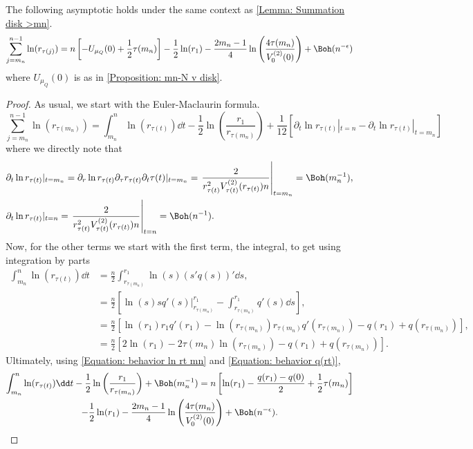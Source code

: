 \begin{proposicao}	\label{Proposition: mn-N lnr disk}
	The following asymptotic holds under the same context as \autoref{Lemma: Summation disk >mn}.
	\begin{equation}
		\sum_{j=m_n}^{n-1} \ln(r_{\tau(j)}) = n \left[- U_{\mu_Q}(0) + \frac{1}{2} \tau(m_n)\right] - \frac{1}{2} \ln(r_1) - \frac{2 m_n - 1}{4} \ln\left( \frac{4 \tau(m_n)}{V^{(2)}_0(0)} \right) + \Boh(n^{-\epsilon})
	\end{equation}
	where $U_{\mu_Q}(0)$ is as in \autoref{Proposition: mn-N v disk}.
\end{proposicao}
\begin{proof}
	As usual, we start with the Euler-Maclaurin formula.
	\begin{equation}
		\sum_{j = m_n}^{n-1} \ln(r_{\tau(m_n)}) = \int_{m_n}^{n} \ln(r_{\tau(t)}) \dd t - \frac{1}{2} \ln\left( \frac{r_1}{r_{\tau(m_n)}}\right) + \frac{1}{12} \left[ \partial_t \ln r_{\tau(t)} |_{t = n} - \partial_t \ln r_{\tau(t)} |_{t = m_n} \right]
	\end{equation} 
	where we directly note that
	\begin{align}
		& \partial_t \ln r_{\tau(t)} |_{t = m_n} = \partial_r \ln r_{\tau(t)} \partial_\tau r_{\tau(t)} \partial_t \tau(t) |_{t = m_n} = \left. \frac{2}{r_{\tau(t)}^2 V^{(2)}_{\tau(t)}(r_{\tau(t)}) n} \right|_{t = m_n} = \Boh(m_n^{-1}), \\
		& \partial_t \ln r_{\tau(t)} |_{t = n} = \left. \frac{2}{r_{\tau(t)}^2 V^{(2)}_{\tau(t)}(r_{\tau(t)}) n} \right|_{t = n} = \Boh(n^{-1}).
	\end{align}
	Now, for the other terms we start with the first term, the integral, to get using integration by parts
	\begin{align}
		 \int_{m_n}^{n} \ln(r_{\tau(t)}) \dd t & = \frac{n}{2}  \int_{r_{\tau(m_n)}}^{r_1} \ln(s) (s' q(s))' \dd s, \\ 
		 & = \frac{n}{2} \left[ \ln(s) s q'(s) \big|_{r_{\tau(m_n)}}^{r_1} -  \int_{r_{\tau(m_n)}}^{r_1} q'(s) \dd s \right], \\
		 & = \frac{n}{2} \left[ \ln(r_1) r_1 q'(r_1) - \ln(r_{\tau(m_n)}) r_{\tau(m_n)} q'(r_{\tau(m_n)}) - q(r_1) + q(r_{\tau(m_n)})\right], \\
		 & = \frac{n}{2} \left[ 2 \ln(r_1) - 2 \tau(m_n)  \ln(r_{\tau(m_n)}) - q(r_1) + q(r_{\tau(m_n)}) \right].
	\end{align}
	Ultimately, using \eqref{Equation: behavior ln rt mn} and \eqref{Equation: behavior q(rt)}, 
	\begin{multline}
		\int_{m_n}^{n} \ln(r_{\tau(t)}) \dd t - \frac{1}{2} \ln\left( \frac{r_1}{r_{\tau(m_n)}}\right) + \Boh(m_n^{-1}) = n \left[ \ln(r_1) - \frac{q(r_1) - q(0)}{2} + \frac{1}{2} \tau(m_n)\right] \\ - \frac{1}{2} \ln(r_1) - \frac{2 m_n - 1}{4} \ln\left( \frac{4 \tau(m_n)}{V^{(2)}_0(0)} \right) + \Boh(n^{-\epsilon}).
	\end{multline}
\end{proof}

